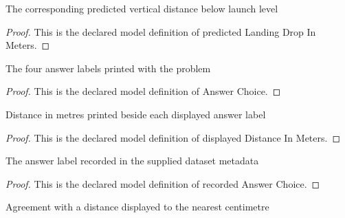 \begin{definition}
  \label{def:physics:phyx-mini-0746:phyxminiproblems-problemphyxmini0746-predictedlandingdropinmeters}
  The corresponding predicted vertical distance below launch level
\end{definition}
\begin{proof}
  This is the declared model definition of predicted Landing Drop In Meters.
\end{proof}
\begin{definition}
  \label{def:physics:phyx-mini-0746:phyxminiproblems-problemphyxmini0746-answerchoice}
  The four answer labels printed with the problem
\end{definition}
\begin{proof}
  This is the declared model definition of Answer Choice.
\end{proof}
\begin{definition}
  \label{def:physics:phyx-mini-0746:phyxminiproblems-problemphyxmini0746-answerchoice-displayeddistanceinmeters}
  Distance in metres printed beside each displayed answer label
\end{definition}
\begin{proof}
  This is the declared model definition of displayed Distance In Meters.
\end{proof}
\begin{definition}
  \label{def:physics:phyx-mini-0746:phyxminiproblems-problemphyxmini0746-recordedanswerchoice}
  The answer label recorded in the supplied dataset metadata
\end{definition}
\begin{proof}
  This is the declared model definition of recorded Answer Choice.
\end{proof}
\begin{definition}
  \label{def:physics:phyx-mini-0746:phyxminiproblems-problemphyxmini0746-matchesdisplayeddistance}
  Agreement with a distance displayed to the nearest centimetre
\end{definition}
